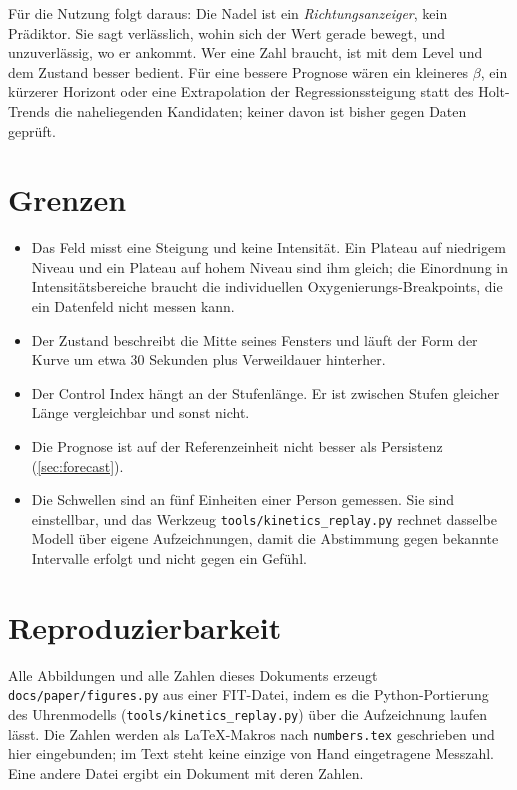 \documentclass[11pt,a4paper]{article}
\begin{document}
Für die Nutzung folgt daraus: Die Nadel ist ein \emph{Richtungsanzeiger}, kein
Prädiktor. Sie sagt verlässlich, wohin sich der Wert gerade bewegt, und
unzuverlässig, wo er ankommt. Wer eine Zahl braucht, ist mit dem Level und dem
Zustand besser bedient. Für eine bessere Prognose wären ein kleineres $\beta$,
ein kürzerer Horizont oder eine Extrapolation der Regressionssteigung statt des
Holt-Trends die naheliegenden Kandidaten; keiner davon ist bisher gegen Daten
geprüft.

\section{Grenzen}

\begin{itemize}
  \item Das Feld misst eine Steigung und keine Intensität. Ein Plateau auf
        niedrigem Niveau und ein Plateau auf hohem Niveau sind ihm gleich; die
        Einordnung in Intensitätsbereiche braucht die individuellen
        Oxygenierungs-Breakpoints, die ein Datenfeld nicht messen kann.
  \item Der Zustand beschreibt die Mitte seines Fensters und läuft der Form der
        Kurve um etwa 30 Sekunden plus Verweildauer hinterher.
  \item Der Control Index hängt an der Stufenlänge. Er ist zwischen Stufen
        gleicher Länge vergleichbar und sonst nicht.
  \item Die Prognose ist auf der Referenzeinheit nicht besser als Persistenz
        (\cref{sec:forecast}).
  \item Die Schwellen sind an fünf Einheiten einer Person gemessen. Sie sind
        einstellbar, und das Werkzeug \texttt{tools/kinetics\_replay.py}
        rechnet dasselbe Modell über eigene Aufzeichnungen, damit die
        Abstimmung gegen bekannte Intervalle erfolgt und nicht gegen ein
        Gefühl.
\end{itemize}

\appendix
\section{Reproduzierbarkeit}

Alle Abbildungen und alle Zahlen dieses Dokuments erzeugt
\texttt{docs/paper/figures.py} aus einer FIT-Datei, indem es die
Python-Portierung des Uhrenmodells (\texttt{tools/kinetics\_replay.py}) über
die Aufzeichnung laufen lässt. Die Zahlen werden als LaTeX-Makros nach
\texttt{numbers.tex} geschrieben und hier eingebunden; im Text steht keine
einzige von Hand eingetragene Messzahl. Eine andere Datei ergibt ein Dokument
mit deren Zahlen.
\end{document}
